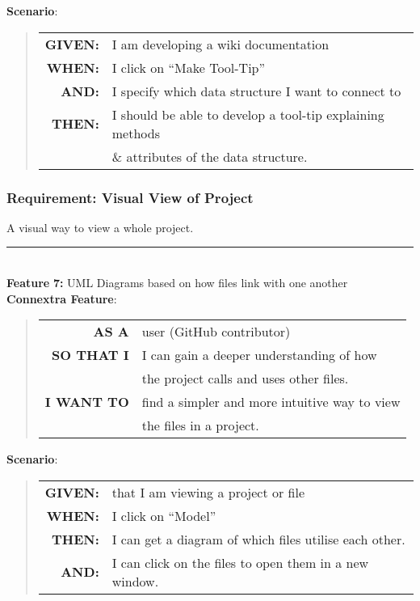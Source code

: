 \documentclass[12pt]{article}
\newcommand{\Feature}[1]{ 
   \noindent \textbf{Feature} #1
}
\newcommand{\GivenSc} {
	\noindent \textbf{GIVEN:}
	}
\newcommand{\WhenSc} {
	\noindent \textbf{WHEN:}
	}
\newcommand{\AndSc} {
	\noindent \textbf{AND:}
	}
\newcommand{\ThenSc} {
	\noindent \textbf{THEN:}
	}
\begin{document}
\begin{framed}
\noindent \textbf{Scenario}:
\begin{quote}
\begin{tabular}{rl}
\GivenSc & I am developing a wiki documentation\\
\WhenSc & I click on ``Make Tool-Tip''\\
\AndSc &  I specify which data structure I want to connect to\\
\ThenSc & I should be able to develop a tool-tip explaining methods\\
        &  \& attributes of the data structure.
\end{tabular}
\end{quote}
\end{framed}

\pagebreak
\begin{framed}
\subsubsection{Requirement: Visual View of Project}
A visual way to view a whole project.\\[0.2cm]

\hrule~\\

\noindent \Feature{\textbf{7:} UML Diagrams based on how files link with one another}\\[0.2cm]

\noindent \textbf{Connextra Feature}:
\begin{quote}
\begin{tabular}{rl}
\textbf{AS A}      & user (\textsf{GitHub} contributor)\\
\textbf{SO THAT I} & I can gain a deeper understanding of how\\
                   &  the project calls and uses other files.\\
\textbf{I WANT TO} & find a simpler and more intuitive way to view\\
& the files in a project.
\end{tabular}
\end{quote}

\noindent \textbf{Scenario}:
\begin{quote}
\begin{tabular}{rl}
\GivenSc & that I am viewing a project or file\\
\WhenSc & I click on ``Model''\\
\ThenSc & I can get a diagram of which files utilise each other.\\
\AndSc & I can click on the files to open them in a new window.
\end{tabular}
\end{quote}


\end{framed}
\end{document}
